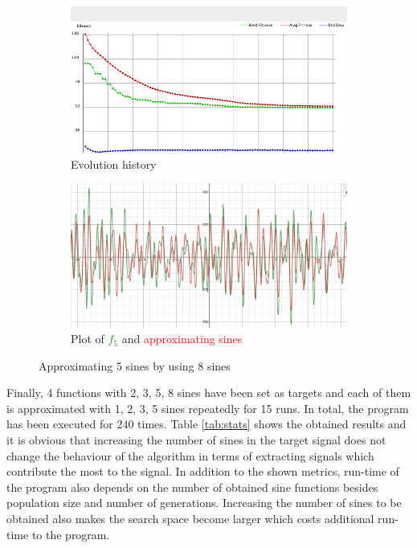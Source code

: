 \documentclass[conference]{IEEEtran}
\begin{document}
\begin{figure}[h]
\centering
\begin{subfigure}{.8\linewidth}
  \centering
  \includegraphics[width=.9\linewidth]{img/sin8_5.png}
  \caption{Evolution history}
  \label{fig:hist_sin5_8}
\end{subfigure}

\begin{subfigure}{.8\linewidth}
  \centering
  \includegraphics[width=.9\linewidth]{img/plot_sin8_5.png}
  \caption{Plot of \textcolor{ForestGreen}{$f_5$} and \textcolor{red}{approximating sines}}
  \label{fig:plot_sin5_8}
\end{subfigure}
\caption{Approximating 5 sines by using 8 sines}
\label{fig:sin5_8}
\end{figure}

Finally, 4 functions with 2, 3, 5, 8 sines have been set as targets and each of them is approximated with 1, 2, 3, 5 sines repeatedly for 15 runs. In total, the program has been executed for 240 times. 
Table \ref{tab:stats} shows the obtained results and it is obvious that increasing the number of sines in the target signal does not change the behaviour of the algorithm in terms of extracting signals 
which contribute the most to the signal. In addition to the shown metrics, run-time of the program also depends on the number of obtained sine functions besides population size and number of generations. 
Increasing the number of sines to be obtained also makes the search space become larger which costs additional run-time to the program.
\end{document}
